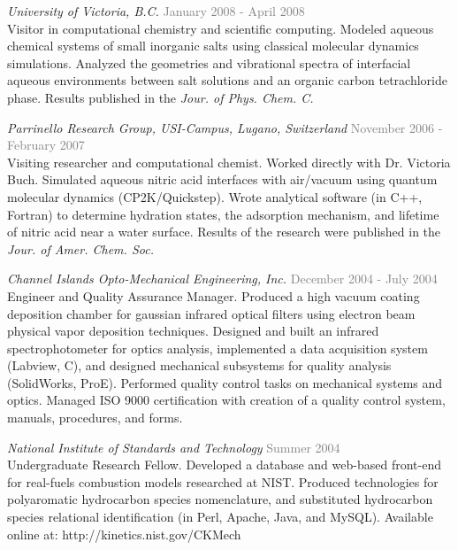\documentclass[margin,line]{res}
\begin{document}
\begin{resume}
\emph{University of Victoria, B.C.} \hfill {\textcolor{gray}{January 2008 - April 2008}}\\
\nopagebreak
Visitor in computational chemistry and scientific computing.  Modeled aqueous chemical systems of small inorganic salts using classical molecular dynamics simulations. Analyzed the geometries and vibrational spectra of interfacial aqueous environments between salt solutions and an organic carbon tetrachloride phase. Results published in the \textit{Jour. of Phys. Chem. C.}

\emph{Parrinello Research Group, USI-Campus, Lugano, Switzerland}  \hfill { \textcolor{gray}{November 2006 - February 2007}} \\
\nopagebreak
Visiting researcher and computational chemist. Worked directly with Dr. Victoria Buch. Simulated aqueous nitric acid interfaces with air/vacuum using quantum molecular dynamics (CP2K/Quickstep). Wrote analytical software (in C++, Fortran) to determine hydration states, the adsorption mechanism, and lifetime of nitric acid near a water surface. Results of the research were published in the \textit{Jour. of Amer. Chem. Soc.}


\pagebreak
\emph{Channel Islands Opto-Mechanical Engineering, Inc.} \hfill {\textcolor{gray}{December 2004 - July 2004}} \\
Engineer and Quality Assurance Manager. Produced a high vacuum coating deposition chamber for gaussian infrared optical filters using electron beam physical vapor deposition techniques. Designed and built an infrared spectrophotometer for optics analysis, implemented a data acquisition system (Labview, C), and designed mechanical subsystems for quality analysis (SolidWorks, ProE). Performed quality control tasks on mechanical systems and optics. Managed ISO 9000 certification with creation of a quality control system, manuals, procedures, and forms. 

\emph{National Institute of Standards and Technology} \hfill {\textcolor{gray}{Summer 2004}} \\
Undergraduate Research Fellow. Developed a database and web-based front-end for real-fuels combustion models researched at NIST. Produced technologies for polyaromatic hydrocarbon species nomenclature, and substituted hydrocarbon species relational identification (in Perl, Apache, Java, and MySQL). Available online at: 
http://kinetics.nist.gov/CKMech


\end{resume}
\end{document}
